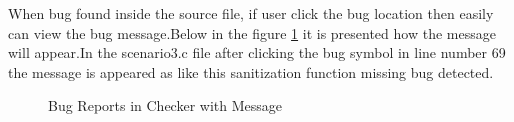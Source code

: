 When bug found inside the source file, if user click the bug location then easily can view the bug message.Below in the figure \ref{bugDetectionWithMessage} it is presented how the message will appear.In the scenario3.c file after clicking the bug symbol in line number 69 the message is appeared as like this sanitization function missing bug detected. 

\begin{figure}[htbp]
	\centering
	\label{bugDetectionWithMessage}
	\caption{Bug Reports in Checker with Message}
\end{figure}

